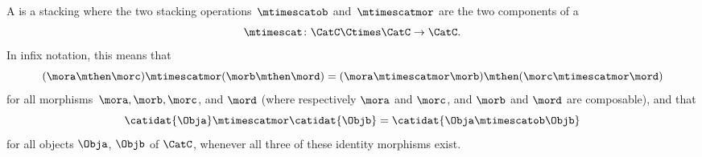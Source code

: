 \begin{ctdefinition}
    \label{def:functorial-stacking-semi-cat}
    A  is a stacking  where the two stacking operations~$\mtimescatob$ and~$\mtimescatmor$ are the two components of a  \begin{equation}
        \mtimescat\colon \CatC \Ctimes \CatC \to \CatC.
    \end{equation}
    In infix notation, this means that
    \begin{equation}
        (\mora \mthen \morc )
        \mtimescatmor (\morb \mthen \mord )
        =
        (\mora \mtimescatmor \morb )
        \mthen (\morc \mtimescatmor \mord )
    \end{equation}
    for all morphisms~$\mora, \morb, \morc$, and $\mord$ (where respectively $\mora$ and $\morc$, and $\morb$ and $\mord$ are composable), and that
    \begin{equation}
        \catidat{\Obja} \mtimescatmor \catidat{\Objb} = \catidat{\Obja \mtimescatob \Objb}
    \end{equation}
    for all objects $\Obja$, $\Objb$ of $\CatC$, whenever all three of these identity morphisms exist.
\end{ctdefinition}

